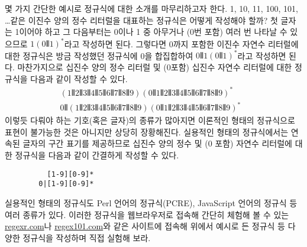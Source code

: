 몇 가지 간단한 예시로 정규식에 대한 소개를 마무리하고자 한다.
1, 10, 11, 100, 101, \ldots 같은 이진수 양의 정수 리터럴을
대표하는 정규식은 어떻게 작성해야 할까? 첫 글자는 1이어야 하고
그 다음부터는 0이나 1 중 아무거나 (0번 포함) 여러 번 나타날 수
있으므로 $1(0\VERT{}1)^{*}$라고 작성하면 된다. 그렇다면 0까지 포함한
이진수 자연수 리터럴에 대한 정규식은 방금 작성했던 정규식에
0을 합집합하여 $0\VERT{}1(0\VERT{}1)^{*}$라고 작성하면 된다.
마찬가지으로 십진수 양의 정수 리터럴 및 (0포함)
십진수 자연수 리터럴에 대한 정규식을 다음과 같이 작성할 수 있다.
\vspace*{-1ex}
\begin{align*}
(1\VERT 2\VERT 3\VERT 4\VERT 5\VERT 6\VERT 7\VERT 8\VERT 9)
 (0\VERT 1\VERT 2\VERT 3\VERT 4\VERT 5\VERT 6\VERT 7\VERT 8\VERT 9)^{*} &
\\
0\VERT
 (1\VERT 2\VERT 3\VERT 4\VERT 5\VERT 6\VERT 7\VERT 8\VERT 9)
 (0\VERT 1\VERT 2\VERT 3\VERT 4\VERT 5\VERT 6\VERT 7\VERT 8\VERT 9)^{*} &
\end{align*}
이렇듯 다뤄야 하는 기호(혹은 글자)의 종류가 많아지면 이론적인 형태의
정규식으로 표현이 불가능한 것은 아니지만 상당히 장황해진다.
실용적인 형태의 정규식에서는 연속된 글자의 구간 표기를 제공하므로
십진수 양의 정수 및 (0 포함) 자연수 리터럴에 대한 정규식을
다음과 같이 간결하게 작성할 수 있다.
\begin{verbatim}
          [1-9][0-9]*
        0|[1-9][0-9]*
\end{verbatim}
실용적인 형태의 정규식도 Perl 언어의 정규식(PCRE),
JavaScript 언어의 정규식 등 여러 종류가 있다.
이러한 정규식을 웹브라우저로 접속해 간단히 체험해 볼 수 있는
\href{https://regexr.com/}{regexr.com}나
\href{https://regex101.com/}{regex101.com}와 같은 사이트에 접속해
위에서 예시로 든 정규식 등 다양한 정규식을 작성하며 직접 실험해 보라.

